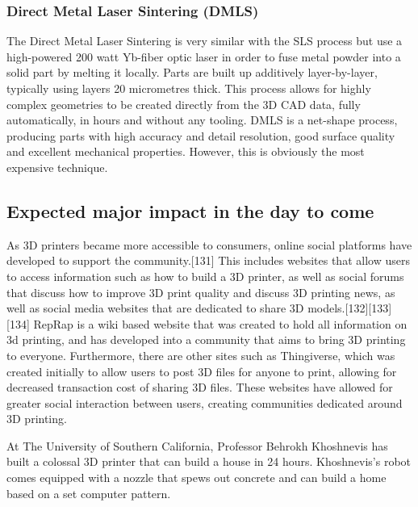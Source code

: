 \subsubsection{Direct Metal Laser Sintering (DMLS)} %

The Direct Metal Laser Sintering is very similar with the SLS process but use a high-powered 200 watt Yb-fiber optic laser in order to fuse metal powder into a solid part by melting it locally. Parts are built up additively layer-by-layer, typically using layers 20 micrometres thick. This process allows for highly complex geometries to be created directly from the 3D CAD data, fully automatically, in hours and without any tooling. DMLS is a net-shape process, producing parts with high accuracy and detail resolution, good surface quality and excellent mechanical properties. However, this is obviously the most expensive technique.

\begin{figure}[h]
    \centering
        \hfil
        \hfil
    \caption{}
    \label{fig:DMLS_technique}
\end{figure}


\subsection{Expected major impact in the day to come} %

As 3D printers became more accessible to consumers, online social platforms have developed to support the community.[131] This includes websites that allow users to access information such as how to build a 3D printer, as well as social forums that discuss how to improve 3D print quality and discuss 3D printing news, as well as social media websites that are dedicated to share 3D models.[132][133][134]
RepRap is a wiki based website that was created to hold all information on 3d printing, and has developed into a community that aims to bring 3D printing to everyone. Furthermore, there are other sites such as Thingiverse, which was created initially to allow users to post 3D files for anyone to print, allowing for decreased transaction cost of sharing 3D files. These websites have allowed for greater social interaction between users, creating communities dedicated around 3D printing.

At The University of Southern California, Professor Behrokh Khoshnevis has built a colossal 3D printer that can build a house in 24 hours. Khoshnevis's robot comes equipped with a nozzle that spews out concrete and can build a home based on a set computer pattern.




